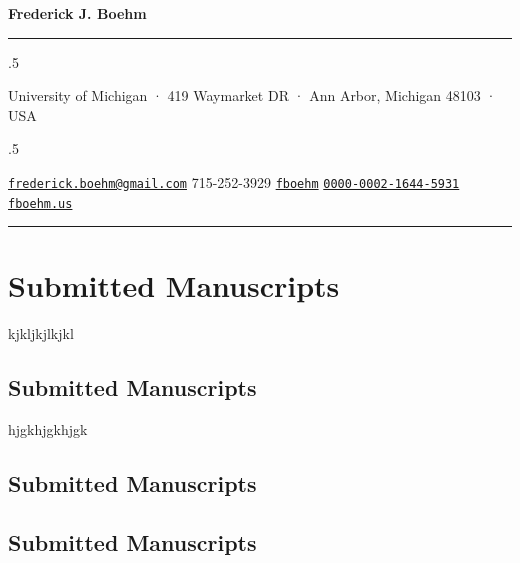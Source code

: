 \documentclass[
  12pt,
]
{article}
\begin{document}
\centerline{\huge \bf Frederick J. Boehm}

\vspace{2 mm}

\hrule

\vspace{2 mm}


\moveleft.5\hoffset\centerline{University of Michigan · 419 Waymarket DR
· Ann Arbor, Michigan 48103 · USA}
\moveleft.5\hoffset\centerline{ \faEnvelopeO \hspace{1 mm} \href{mailto:}{\tt frederick.boehm@gmail.com} \hspace{1 mm}  \faPhone \hspace{1 mm}  715-252-3929  \hspace{1 mm}  \faGithub \hspace{1 mm} \href{http://github.com/fboehm}{\tt fboehm} \hspace{1 mm}      \hspace{.5 mm} \href{https://orcid.org/0000-0002-1644-5931}{\tt 0000-0002-1644-5931} \hspace{1 mm}  \faGlobe \hspace{1 mm} \href{http://fboehm.us}{\tt fboehm.us}   }



\vspace{2 mm}

\hrule



\hypertarget{submitted-manuscripts}{%
\section{Submitted Manuscripts}\label{submitted-manuscripts}}

kjkljkjlkjkl

\hypertarget{submitted-manuscripts-1}{%
\subsection{Submitted Manuscripts}\label{submitted-manuscripts-1}}

hjgkhjgkhjgk

\hypertarget{submitted-manuscripts-2}{%
\subsection{Submitted Manuscripts}\label{submitted-manuscripts-2}}

\hypertarget{submitted-manuscripts-3}{%
\subsection{Submitted Manuscripts}\label{submitted-manuscripts-3}}
\end{document}
